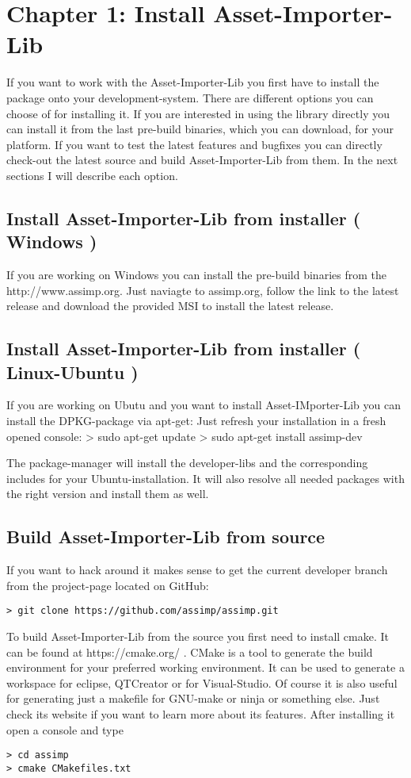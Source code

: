 
\section{Chapter 1: Install Asset-Importer-Lib}
If you want to work with the Asset-Importer-Lib you first have to install the package onto your development-system. There are different options you can choose of for installing it.
If you are interested in using the library directly you can install it from the last pre-build binaries, which you can download, for your platform. If you want to test the
latest features and bugfixes you can directly check-out the latest source and build Asset-Importer-Lib from them. 
In the next sections I will describe each option.

\subsection{Install Asset-Importer-Lib from installer ( Windows ) }
If you are working on Windows you can install the pre-build binaries from the http://www.assimp.org. Just naviagte to assimp.org, follow the link to the latest release and download the 
provided MSI to install the latest release.

\subsection{Install Asset-Importer-Lib from installer ( Linux-Ubuntu ) }
If you are working on Ubutu and you want to install Asset-IMporter-Lib you can install the DPKG-package via apt-get:
Just refresh your installation in a fresh opened console:
> sudo apt-get update
> sudo apt-get install assimp-dev
\par
The package-manager will install the developer-libs and the corresponding includes for your Ubuntu-installation. It will also resolve all needed packages with 
the right version and install them as well.
\subsection{Build Asset-Importer-Lib from source}
If you want to hack around it makes sense to get the current developer branch from the project-page located on GitHub:
\begin{lstlisting}[label=some-code,caption=Checkout the source from the assimp github project repo]
> git clone https://github.com/assimp/assimp.git
\end{lstlisting}

To build Asset-Importer-Lib from the source you first need to install cmake. It can be found at https://cmake.org/ . CMake is a tool to generate the build environment 
for your preferred working environment. It can be used to generate a workspace for eclipse, QTCreator or for Visual-Studio. Of course it is also useful for generating just 
a makefile for GNU-make or ninja or something else. Just check its website if you want to learn more about its features. After installing it open a console and type
\begin{lstlisting}[label=some-code,caption=Generate the makefile for Linux]
> cd assimp
> cmake CMakefiles.txt
\end{lstlisting}

